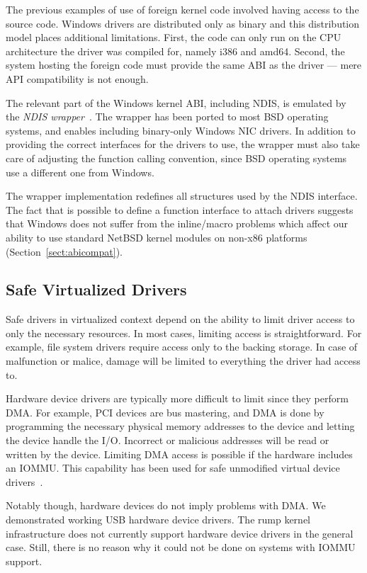 The previous examples of use of foreign kernel code involved having
access to the source code.  Windows drivers are distributed only as
binary and this distribution model places additional limitations.  First, the code can
only run on the CPU architecture the driver was compiled for, namely i386 and amd64.
Second, the system hosting the foreign code must provide the same
ABI as the driver --- mere API compatibility is not enough.

The relevant part of the Windows kernel ABI, including NDIS, is
emulated by the \textit{NDIS wrapper}~\cite{ndis:fbman4}.  The
wrapper has been ported to most BSD operating systems, and enables
including binary-only Windows NIC drivers.  In addition to providing
the correct interfaces for the drivers to use, the wrapper must also
take care of adjusting the function calling convention, since BSD
operating systems use a different one from Windows.

The wrapper implementation redefines all structures used by the NDIS
interface.  The fact that is possible to
define a function interface to attach drivers suggests that
Windows does not suffer from the inline/macro problems which affect
our ability to use standard NetBSD kernel modules on non-x86
platforms (Section~\ref{sect:abicompat}).


\subsection{Safe Virtualized Drivers}

Safe drivers in virtualized context depend on the ability to limit
driver access to only the necessary resources.  In most cases, limiting access
is straightforward.  For example, file system drivers require access
only to the backing storage.  In case of malfunction or malice,
damage will be limited to everything the driver had access to.

Hardware device drivers are typically more difficult to limit
since they perform DMA.  For example, PCI devices are bus
mastering, and DMA is done by programming the necessary physical
memory addresses to the device and letting the device handle the
I/O.  Incorrect or malicious addresses will be read or written by
the device.  Limiting DMA access is possible if the hardware includes
an IOMMU.  This capability has been used for safe unmodified virtual
device drivers~\cite{levasseur:driverreuse}.

Notably though, hardware devices do not imply problems with DMA.
We demonstrated working USB hardware device drivers.  The rump
kernel infrastructure does not currently support hardware device drivers
in the general case.  Still, there is no reason why it could not be done
on systems with IOMMU support.


